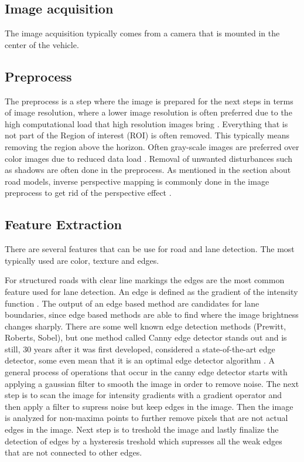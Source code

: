 \subsection{Image acquisition}
The image acquisition typically comes from a camera that is mounted in the center of the vehicle.
\subsection{Preprocess}
The preprocess is a step where the image is prepared for the next steps in terms of image resolution, where a lower image resolution is often preferred due to the high computational load that high resolution images bring \cite{Yenikaya:2013:KVR:2522968.2522970}. Everything that is not part of the Region of interest (ROI) is often removed. This typically means removing the region above the horizon. Often gray-scale images are preferred over color images due to reduced data load \cite{Yenikaya:2013:KVR:2522968.2522970}. Removal of unwanted disturbances such as shadows are often done in the preprocess. As mentioned in the section about road models, inverse perspective mapping is commonly done in the image preprocess to get rid of the perspective effect \cite{bertozzi1998gold}.

\subsection{Feature Extraction}
There are several features that can be use for road and lane detection. The most typically used are color, texture and edges.

For structured roads with clear line markings the edges are the most common feature used for lane detection. An edge is defined as the gradient of the intensity function \cite{Yenikaya:2013:KVR:2522968.2522970}. The output of an edge based method are candidates for lane boundaries, since edge based methods are able to find where the image brightness changes sharply. There are some well known edge detection methods (Prewitt, Roberts, Sobel), but one method called Canny edge detector stands out and is still, 30 years after it was first developed, considered a state-of-the-art edge detector, some even mean that it is an optimal edge detector algorithm \cite{bhadauria2013comparison}. A general process of operations that occur in the canny edge detector starts with applying a gaussian filter to smooth the image in order to remove noise. The next step is to scan the image for intensity gradients with a gradient operator and then apply a filter to supress noise but keep edges in the image. Then the image is analyzed for non-maxima points to further remove pixels that are not actual edges in the image. Next step is to treshold the image and lastly finalize the detection of edges by a hysteresis treshold which supresses all the weak edges that are not connected to other edges.\\

